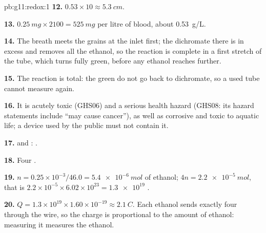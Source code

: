 \begin{solution}{pb:g11:redox:1}
\textbf{12.} $0.53 \times 10 \approx \qty{5.3}{cm}$.

\textbf{13.} $\qty{0.25}{mg} \times 2100 = \qty{525}{mg}$ per litre of
blood, about \qty{0.53}{g/L}.

\textbf{14.} The breath meets the grains at the inlet first; the
dichromate there is in excess and removes all the ethanol, so the
reaction is complete in a first stretch of the tube, which turns fully
green, before any ethanol reaches further.

\textbf{15.} The reaction is total: the green   do not go
back to dichromate, so a used tube cannot measure again.

\textbf{16.} It is acutely toxic (GHS06) and a serious health hazard
(GHS08: its hazard statements include ``may cause cancer''), as well as
corrosive and toxic to aquatic life; a device used by the public must
not contain it.

\textbf{17.}  and
:
.

\textbf{18.} Four .

\textbf{19.} $n = 0.25\times 10^{-3}/46.0 = \qty{5.4e-6}{mol}$ of
ethanol;  $4n = \qty{2.2e-5}{mol}$, that is
$2.2\times 10^{-5}\times 6.02\times 10^{23} = \num{1.3e19}$ .

\textbf{20.} $Q = 1.3\times 10^{19}\times 1.60\times 10^{-19} \approx
\qty{2.1}{C}$. Each ethanol  sends exactly four 
through the wire, so the charge is proportional to the amount of
ethanol: measuring it measures the ethanol.
\end{solution}
